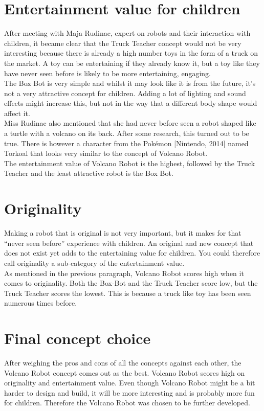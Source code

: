 \documentclass[11pt,twoside,a4paper]{report}
\begin{document}
\section{Entertainment value for children}
After meeting with Maja Rudinac, expert on robots and their interaction with children, it became clear that the Truck Teacher concept would not be very interesting because there is already a high number toys in the form of a truck on the market. A toy can be entertaining if they already know it, but a toy like they have never seen before is likely to be more entertaining, engaging. \\
The Box Bot is very simple and whilst it may look like it is from the future, it’s not a very attractive concept for children. Adding a lot of lighting and sound effects might increase this, but not in the way that a different body shape would affect it.\\
Miss Rudinac also mentioned that she had never before seen a robot shaped like a turtle with a volcano on its back. After some research, this turned out to be true. There is however a character from the Pokémon [Nintendo, 2014] named Torkoal that looks very similar to the concept of Volcano Robot.\\
The entertainment value of Volcano Robot is the highest, followed by the Truck Teacher and the least attractive robot is the Box Bot.
\section{Originality}
Making a robot that is original is not very important, but it makes for that “never seen before” experience with children. An original and new concept that does not exist yet adds to the entertaining value for children. You could therefore call originality a sub-category of the entertainment value.\\
As mentioned in the previous paragraph, Volcano Robot scores high when it comes to originality. Both the Box-Bot and the Truck Teacher score low, but the Truck Teacher scores the lowest. This is because a truck like toy has been seen numerous times before.
\section{Final concept choice}
After weighing the pros and cons of all the concepts against each other, the Volcano Robot concept comes out as the best. Volcano Robot scores high on originality and entertainment value. Even though Volcano Robot might be a bit harder to design and build, it will be more interesting and is probably more fun for children. Therefore the Volcano Robot was chosen to be further developed.
\end{document}
